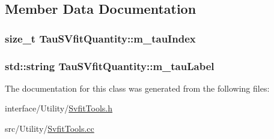 \subsection{Member Data Documentation}
\hypertarget{classTauSVfitQuantity_ab5bea2b1a5fed277f0ebe1a3389636e2}{
\subsubsection[{m\_\-tauIndex}]{\setlength{\rightskip}{0pt plus 5cm}size\_\-t {\bf TauSVfitQuantity::m\_\-tauIndex}}}
\label{classTauSVfitQuantity_ab5bea2b1a5fed277f0ebe1a3389636e2}
\hypertarget{classTauSVfitQuantity_a3845377e0a9fe8ee92687c36b45cc47d}{
\subsubsection[{m\_\-tauLabel}]{\setlength{\rightskip}{0pt plus 5cm}std::string {\bf TauSVfitQuantity::m\_\-tauLabel}}}
\label{classTauSVfitQuantity_a3845377e0a9fe8ee92687c36b45cc47d}


The documentation for this class was generated from the following files:\begin{DoxyCompactItemize}
\item 
interface/Utility/\hyperlink{SvfitTools_8h}{SvfitTools.h}\item 
src/Utility/\hyperlink{SvfitTools_8cc}{SvfitTools.cc}\end{DoxyCompactItemize}
